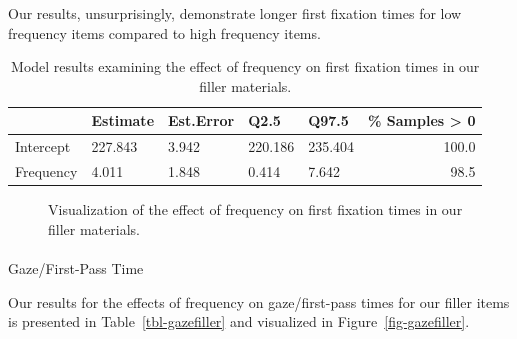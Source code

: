 \documentclass[
  12pt,
  letterpaper,
]{scrreprt}
\makeatletter
\let\oldparagraph\paragraph
\renewcommand{\paragraph}{
    \@ifstar
      \xxxParagraphStar
      \xxxParagraphNoStar
  }
\newcommand{\xxxParagraphStar}[1]{\oldparagraph*{#1}\mbox{}}
\newcommand{\xxxParagraphNoStar}[1]{\oldparagraph{#1}\mbox{}}
\makeatother
\begin{document}
Our results, unsurprisingly, demonstrate longer first fixation times for
low frequency items compared to high frequency items.

\begin{longtable}[]{@{}lllllr@{}}

\caption{\label{tbl-firstfixationfiller}Model results examining the
effect of frequency on first fixation times in our filler materials.}

\tabularnewline

\toprule\noalign{}
& Estimate & Est.Error & Q2.5 & Q97.5 & \% Samples \textgreater{} 0 \\
\midrule\noalign{}
\endhead
\bottomrule\noalign{}
\endlastfoot
Intercept & 227.843 & 3.942 & 220.186 & 235.404 & 100.0 \\
Frequency & 4.011 & 1.848 & 0.414 & 7.642 & 98.5 \\

\end{longtable}

\begin{figure}[htbp]

\caption{\label{fig-firstfixationfiller}Visualization of the effect of
frequency on first fixation times in our filler materials.}


\end{figure}%

\paragraph{Gaze/First-Pass Time}\label{gazefirst-pass-time-2}

Our results for the effects of frequency on gaze/first-pass times for
our filler items is presented in Table~\ref{tbl-gazefiller} and
visualized in Figure~\ref{fig-gazefiller}.
\end{document}
